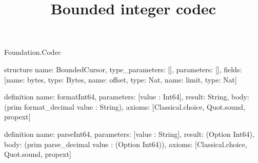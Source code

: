 \begin{lexlean}{Foundation.Codec}
\title{Bounded integer codec}
\begin{semanticmodule}
structure{
  name: BoundedCursor,
  type_parameters: [],
  parameters: [],
  fields: [{name: bytes, type: Bytes}, {name: offset, type: Nat}, {name: limit, type: Nat}]
}

definition{
  name: formatInt64,
  parameters: [value : Int64],
  result: String,
  body: (prim format_decimal value : String),
  axioms: [Classical.choice, Quot.sound, propext]
}

definition{
  name: parseInt64,
  parameters: [value : String],
  result: (Option Int64),
  body: (prim parse_decimal value : (Option Int64)),
  axioms: [Classical.choice, Quot.sound, propext]
}
\end{semanticmodule}
\end{lexlean}
